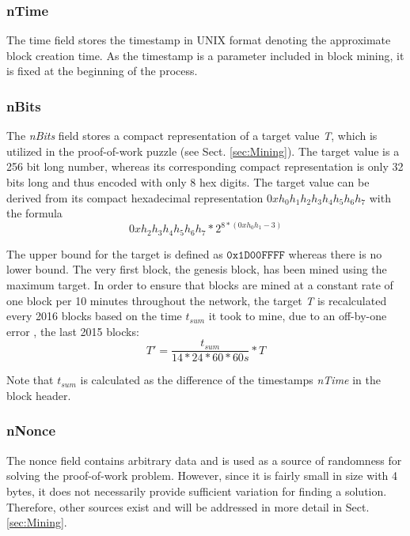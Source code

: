 \subsubsection*{nTime}
The time field stores the timestamp in UNIX format denoting the approximate block creation time. As the timestamp is a parameter included in block mining, it is fixed at the beginning of the process.


\subsubsection*{nBits}
The \textit{nBits} field stores a compact representation of a target value \emph{T}, which is utilized in the proof-of-work puzzle (see Sect. \ref{sec:Mining}). The target value is a 256 bit long number, whereas its corresponding compact representation is only 32 bits long and thus encoded with only 8 hex digits. The target value can be derived from its compact hexadecimal representation $\mathit{0xh_{0}h_{1}h_{2}h_{3}h_{4}h_{5}h_{6}h_{7}}$ with the formula
\begin{equation}
0xh_{2}h_{3}h_{4}h_{5}h_{6}h_{7} * 2^{8*(0xh_{0}h_{1} - 3)}
\end{equation}


\noindent
The upper bound for the target is defined as $\texttt{0x1D00FFFF}$ whereas there is no lower bound. The very first block, the genesis block, has been mined using the maximum target. In order to ensure that blocks are mined at a constant rate of one block per 10 minutes throughout the network, the target \emph{T} is recalculated every 2016 blocks based on the time $\mathit{t_{sum}}$ it took to mine, due to an off-by-one error \cite{nBitsCalc}, the last 2015 blocks:
\begin{equation}
T' = \dfrac{t_{sum}}{14*24*60*60s}*T
\end{equation}

\noindent
Note that $\mathit{t_{sum}}$ is calculated as the difference of the timestamps \textit{nTime} in the block header.

\subsubsection*{nNonce}
The nonce field contains arbitrary data and is used as a source of randomness for solving the proof-of-work problem. However, since it is fairly small in size with 4 bytes, it does not necessarily provide sufficient variation for finding a solution. Therefore, other sources exist and will be addressed in more detail in Sect. \ref{sec:Mining}.


